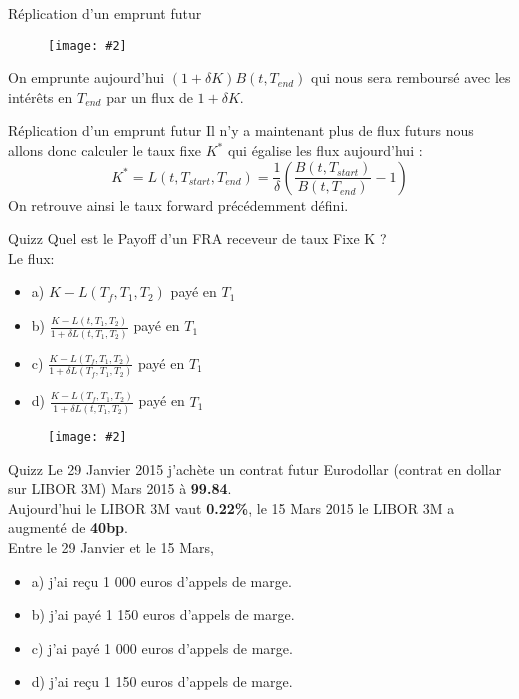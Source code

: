 \documentclass{beamer}
\newcommand{\FIG}[2]{\texttt{[image: \#2]}}
\begin{document}
\begin{frame}{Réplication d'un emprunt futur}
\begin{center}
\begin{figure}[h]
\FIG{4in}{figures/fwd_replic3.png}
\end{figure}
\end{center}
On emprunte aujourd'hui $(1+\delta K)B(t,T_{end})$ qui nous sera remboursé avec les intérêts en $T_{end}$ par un flux de $1+\delta K$.
\end{frame}

\begin{frame}{Réplication d'un emprunt futur}
Il n'y a maintenant plus de flux futurs nous allons donc calculer le taux fixe $K^*$ qui égalise les flux aujourd'hui :
\[
K^*=L(t,T_{start}, T_{end})=\frac{1}{\delta}\left(\frac{B(t,T_{start})}{B(t,T_{end})}-1\right)
\]
On retrouve ainsi le taux forward précédemment défini.
\end{frame}

\begin{frame}{Quizz}
Quel est le Payoff d'un FRA receveur de taux Fixe K ?\\
\vspace{0.5cm}
Le flux:
\begin{itemize}
\item a) $K - L(T_f,T_{1},T_{2})$ payé en $T_1$
\item b) $\frac{K - L(t,T_{1},T_{2})}{1+\delta  L(t,T_{1},T_{2})}$ payé en $T_1$
\item c) $\frac{K - L(T_f,T_{1},T_{2})}{1+\delta  L(T_f,T_{1},T_{2})}$ payé en $T_1$
\item d) $\frac{K - L(T_f,T_{1},T_{2})}{1+\delta  L(t,T_{1},T_{2})}$ payé en $T_1$
\end{itemize}
\begin{figure}[h]
\FIG{10cm}{figures/schema_fra.jpg}
\end{figure}

\end{frame}

\begin{frame}{Quizz}
Le 29 Janvier 2015 j'achète un contrat futur Eurodollar (contrat en dollar sur LIBOR 3M) Mars 2015 à \textbf{99.84}.\\
Aujourd'hui le LIBOR 3M vaut \textbf{0.22\%}, le 15 Mars 2015 le LIBOR 3M a augmenté de \textbf{40bp}.\\
\vspace{0.5cm}
Entre le 29 Janvier et le 15 Mars,\\
\begin{itemize}
\item a) j'ai reçu 1 000 euros d'appels de marge.
\item b) j'ai payé 1 150 euros d'appels de marge.
\item c) j'ai payé 1 000 euros d'appels de marge.
\item d) j'ai reçu 1 150 euros d'appels de marge.
\end{itemize}
\end{frame}
\end{document}

